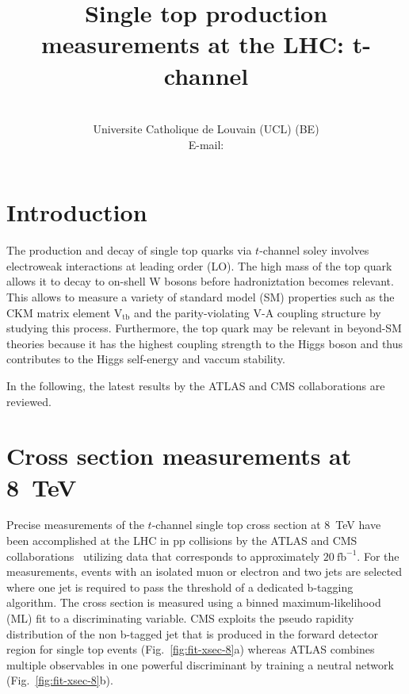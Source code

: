 \documentclass{PoS}
\title{Single top production measurements at the LHC: t-channel}
\author{
    \speaker{Matthias Komm}\\
    Universite Catholique de Louvain (UCL) (BE)\\
    E-mail: \email{Matthias.Komm@cern.ch}
}
\begin{document}
\section{Introduction}
The production and decay of single top quarks via $t$-channel soley involves electroweak interactions at leading order (LO). The high mass of the top quark allows it to decay to on-shell W bosons before hadroniztation becomes relevant. This allows to measure a variety of standard model (SM) properties such as the CKM matrix element $\mathrm{V_{tb}}$ and the parity-violating V-A coupling structure by studying this process. Furthermore, the top quark may be relevant in beyond-SM theories because it has the highest coupling strength to the Higgs boson and thus contributes to the Higgs self-energy and vaccum stability.

In the following, the latest results by the ATLAS and CMS collaborations are reviewed.

\section{Cross section measurements at 8~TeV}
Precise measurements of the $t$-channel single top cross section at 8~TeV have been accomplished at the LHC in pp collisions by the ATLAS and CMS collaborations~\cite{atlas-xsec8,cms-xsec8} utilizing data that corresponds to approximately $20~\mathrm{fb}^{-1}$. For the measurements, events with an isolated muon or electron and two jets are selected where one jet is required to pass the threshold of a dedicated b-tagging algorithm. The cross section is measured using a binned maximum-likelihood (ML) fit to a discriminating variable. CMS exploits the pseudo rapidity distribution of the non b-tagged jet that is produced in the forward detector region for single top events (Fig.~\ref{fig:fit-xsec-8}a) whereas ATLAS combines multiple observables in one powerful discriminant by training a neutral network (Fig.~\ref{fig:fit-xsec-8}b).
\end{document}

